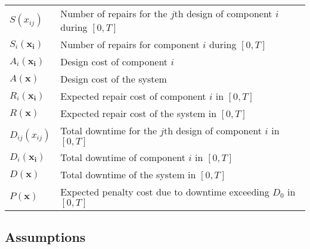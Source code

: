 \documentclass[preprint,12pt]{elsarticle}
\begin{document}
\begin{tabular}{l l}
$S(x_{ij})$ & Number of repairs for the $j$th design of component $i$ during $[0,T]$\\
$S_{i}(\boldsymbol{x_{i}})$ & Number of repairs for component $i$ during $[0,T]$\\
$A_{i}(\boldsymbol{x_{i}})$  & Design cost of component $i$\\
$A(\boldsymbol{x})$ & Design cost of the system\\
$R_{i}(\boldsymbol{x_{i}})$ & Expected repair cost of component $i$ in $[0, T]$\\
$R(\boldsymbol{x})$ &  Expected repair cost of the system in $[0, T]$\\
$D_{ij}(x_{ij})$ & Total downtime for the $j$th design of component $i$ in $[0, T]$\\
$D_{i}(\boldsymbol{x_{i}})$& Total downtime of component $i$ in $[0, T]$\\
$D(\boldsymbol{x})$ & Total downtime of the system in $[0, T]$\\
$P(\boldsymbol{x})$ & Expected penalty cost due to downtime exceeding $D_{0}$ in $[0, T]$\\

	\end{tabular}
	 \subsection{Assumptions}
	
\end{document}
